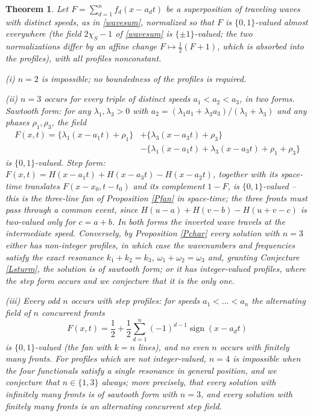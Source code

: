 \documentclass{article}
\newcommand{\tmop}[1]{\ensuremath{\operatorname{#1}}}
\newtheorem{theorem}{Theorem}
\begin{document}
	\begin{theorem}\label{Twaves}
		Let $F=\sum_{d=1}^nf_d(x-a_dt)$ be a superposition of traveling waves with distinct speeds, as in \eqref{wavesum}, normalized so that $F$ is $\{0,1\}$-valued almost everywhere (the field $2\chi_S-1$ of \eqref{wavesum} is $\{\pm1\}$-valued; the two normalizations differ by an affine change $F\mapsto\frac12(F+1)$, which is absorbed into the profiles), with all profiles nonconstant.

		(i) $n=2$ is impossible; no boundedness of the profiles is required.

		(ii) $n=3$ occurs for every triple of distinct speeds $a_1<a_2<a_3$, in two forms. \emph{Sawtooth form}: for any $\lambda_1,\lambda_3>0$ with
		$a_2=(\lambda_1a_1+\lambda_3a_3)/(\lambda_1+\lambda_3)$ and any phases $\rho_1,\rho_3$, the field
		\begin{align*}
			F(x,t)=\{\lambda_1(x-a_1t)+\rho_1\}&+\{\lambda_3(x-a_3t)+\rho_3\}\\
			&-\{\lambda_1(x-a_1t)+\lambda_3(x-a_3t)+\rho_1+\rho_3\}
		\end{align*}
		is $\{0,1\}$-valued. \emph{Step form}: $F(x,t)=H(x-a_1t)+H(x-a_3t)-H(x-a_2t)$, together with its space-time translates $F(x-x_0,t-t_0)$ and its complement $1-F$, is $\{0,1\}$-valued -- this is the three-line fan of Proposition \ref{Pfan} in space-time; the three fronts must pass through a common event, since $H(u-a)+H(v-b)-H(u+v-c)$ is two-valued only for $c=a+b$. In both forms the inverted wave travels at the intermediate speed. Conversely, by Proposition \ref{Pchar} every solution with $n=3$ either has non-integer profiles, in which case the wavenumbers and frequencies satisfy the exact resonance $k_1+k_2=k_3$, $\omega_1+\omega_2=\omega_3$ and, granting Conjecture \ref{Lsturm}, the solution is of sawtooth form; or it has integer-valued profiles, where the step form occurs and we conjecture that it is the only one.

		(iii) Every odd $n$ occurs with step profiles: for speeds $a_1<\dots<a_n$ the alternating field of $n$ concurrent fronts
		$$F(x,t)=\frac12+\frac12\sum_{d=1}^n(-1)^{d-1}\tmop{sign}(x-a_dt)$$
		is $\{0,1\}$-valued (the fan with $k=n$ lines), and no even $n$ occurs with finitely many fronts. For profiles which are not integer-valued, $n=4$ is impossible when the four functionals satisfy a single resonance in general position, and we conjecture that $n\in\{1,3\}$ always; more precisely, that every solution with infinitely many fronts is of sawtooth form with $n=3$, and every solution with finitely many fronts is an alternating concurrent step field.
	\end{theorem}
\end{document}
